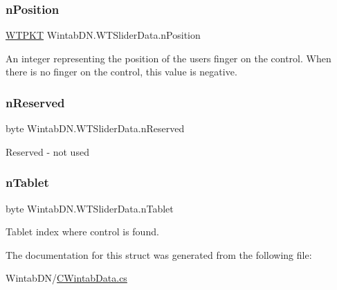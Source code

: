 \subsubsection{\texorpdfstring{n\+Position}{nPosition}}
{\footnotesize\ttfamily \mbox{\hyperlink{class_wintab_d_n_1_1_w_t_p_k_t}{W\+T\+P\+KT}} Wintab\+D\+N.\+W\+T\+Slider\+Data.\+n\+Position}



An integer representing the position of the user\textquotesingle{}s finger on the control. When there is no finger on the control, this value is negative. 

\mbox{\label{struct_wintab_d_n_1_1_w_t_slider_data_a2c95760e55826cc16272b70178222302}} 
\subsubsection{\texorpdfstring{n\+Reserved}{nReserved}}
{\footnotesize\ttfamily byte Wintab\+D\+N.\+W\+T\+Slider\+Data.\+n\+Reserved}



Reserved -\/ not used 

\mbox{\label{struct_wintab_d_n_1_1_w_t_slider_data_a2aab08d5288b117d39fd317776e43f6d}} 
\subsubsection{\texorpdfstring{n\+Tablet}{nTablet}}
{\footnotesize\ttfamily byte Wintab\+D\+N.\+W\+T\+Slider\+Data.\+n\+Tablet}



Tablet index where control is found. 



The documentation for this struct was generated from the following file\+:\begin{DoxyCompactItemize}
\item 
Wintab\+D\+N/\mbox{\hyperlink{_c_wintab_data_8cs}{C\+Wintab\+Data.\+cs}}\end{DoxyCompactItemize}
